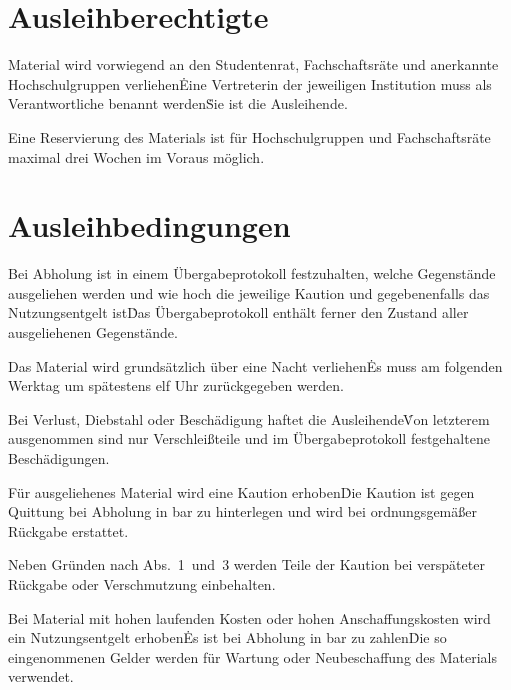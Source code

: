 \setcounter{section}{0} %
\begin{multicols}{2}
 

\section{Ausleihberechtigte}

\Abs \Satz Material wird vorwiegend an den Studentenrat, Fachschaftsräte und anerkannte Hochschulgruppen verliehen\. Eine Vertreterin der jeweiligen Institution muss als Verantwortliche benannt werden\. Sie ist die Ausleihende.

\Abs \Satz Eine Reservierung des Materials ist für Hochschulgruppen und Fachschaftsräte maximal drei Wochen im Voraus möglich.



\section{Ausleihbedingungen}

\Abs \Satz Bei Abholung ist in einem Übergabeprotokoll festzuhalten, welche Gegenstände ausgeliehen werden und wie hoch die jeweilige Kaution und gegebenenfalls das Nutzungsentgelt ist\. Das Übergabeprotokoll enthält ferner den Zustand aller ausgeliehenen Gegenstände.

\Abs \Satz Das Material wird grundsätzlich über eine Nacht verliehen\. Es muss am folgenden Werktag um spätestens elf Uhr zurückgegeben werden.

\Abs \Satz Bei Verlust, Diebstahl oder Beschädigung haftet die Ausleihende\. Von letzterem ausgenommen sind nur Verschleißteile und im Übergabeprotokoll festgehaltene Beschädigungen.

\Abs \Satz Für ausgeliehenes Material wird eine Kaution erhoben\. Die Kaution ist gegen Quittung bei Abholung in bar zu hinterlegen und wird bei ordnungsgemäßer Rückgabe erstattet.

\Abs \Satz Neben Gründen nach Abs.~1~und~3 werden Teile der Kaution bei verspäteter Rückgabe oder Verschmutzung einbehalten.

\Abs \Satz Bei Material mit hohen laufenden Kosten oder hohen Anschaffungskosten wird ein Nutzungsentgelt erhoben\. Es ist bei Abholung in bar zu zahlen\. Die so eingenommenen Gelder werden für Wartung oder Neubeschaffung des Materials verwendet.




\end{multicols}
